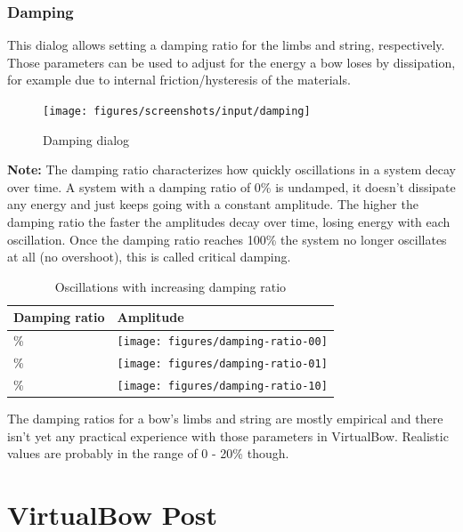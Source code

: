 \documentclass[12pt]{article}
\begin{document}
\newpage
\subsubsection{Damping}

This dialog allows setting a damping ratio for the limbs and string, respectively.
Those parameters can be used to adjust for the energy a bow loses by dissipation, for example due to internal friction/hysteresis of the materials.

\bigskip

\begin{figure}[H]
\centering
\texttt{[image: figures/screenshots/input/damping]}
\caption{Damping dialog}
\label{fig:damping}
\end{figure}

\textbf{Note:} The damping ratio characterizes how quickly oscillations in a system decay over time.
A system with a damping ratio of 0\% is undamped, it doesn't dissipate any energy and just keeps going with a constant amplitude.
The higher the damping ratio the faster the amplitudes decay over time, losing energy with each oscillation.
Once the damping ratio reaches 100\% the system no longer oscillates at all (no overshoot), this is called critical damping.

\begin{table}[H]
\centering
\begin{tabular}{| m{4cm} | m{4cm} |}
\hline
\textbf{Damping ratio} & \textbf{Amplitude} \\ \hline
\center 0\% & \texttt{[image: figures/damping-ratio-00]} \\ \hline
\center 10\% & \texttt{[image: figures/damping-ratio-01]} \\ \hline
\center 100\% & \texttt{[image: figures/damping-ratio-10]} \\ \hline
\end{tabular}
\caption{Oscillations with increasing damping ratio}
\label{tbl:damping-ratio}
\end{table}

The damping ratios for a bow's limbs and string are mostly empirical and there isn't yet any practical experience with those parameters in VirtualBow.
Realistic values are probably in the range of 0 - 20\% though.



\newpage
\section{VirtualBow Post}
\end{document}
